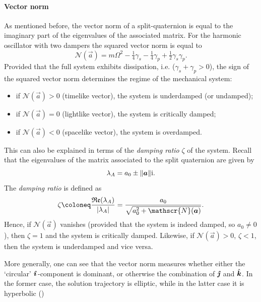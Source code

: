 \paragraph{Vector norm}
As mentioned before, the vector norm of a split-quaternion is equal to the imaginary part of the eigenvalues of the associated matrix. For the harmonic oscillator with two dampers the squared vector norm is equal to 
$$ \mathscr{N}(\vec{a}) = m\Omega^2 - \tfrac{1}{4}\gamma_s - \tfrac{1}{4}\gamma_p + \tfrac{1}{2}\gamma_s \gamma_p. $$
Provided that the full system exhibits dissipation, i.e. ($\gamma_s + \gamma_p > 0$), the sign of the squared vector norm determines the regime of the mechanical system:
\begin{itemize}
    \item if $\mathscr{N}(\vec{a}) > 0$ (timelike vector), the system is underdamped (or undamped); 
    \item if $\mathscr{N}(\vec{a}) = 0$ (lightlike vector), the system is critically damped; 
    \item if $\mathscr{N}(\vec{a}) < 0$ (spacelike vector), the system is overdamped.
\end{itemize}
This can also be explained in terms of the \emph{damping ratio} $\zeta$ of the system. Recall that the eigenvalues of the matrix associated to the split quaternion are given by
\begin{equation}
    \lambda_A = a_0 \pm \norm{\vec{a}}\ii.
\end{equation}
The \emph{damping ratio} is defined as
\begin{equation}
    \zeta \coloneq \frac{\Re(\lambda_A)}{\abs{\lambda_A}} = \frac{a_0}{\sqrt{a_0^2 + \mathscr{N}(\vec{a})}}.
\end{equation}
Hence, if $\mathscr{N}(\vec{a})$ vanishes (provided that the system is indeed damped, so $a_0 \neq 0$), then $\zeta = 1$ and the system is critically damped. Likewise, if $\mathscr{N}(\vec{a}) > 0$, $\zeta < 1$, then the system is underdamped and vice versa.

More generally, one can see that the vector norm measures whether either the `circular' $\quati$-component is dominant, or otherwise the combination of $\quatj$ and $\quatk$. In the former case, the solution trajectory is elliptic, while in the latter case it is hyperbolic ()

